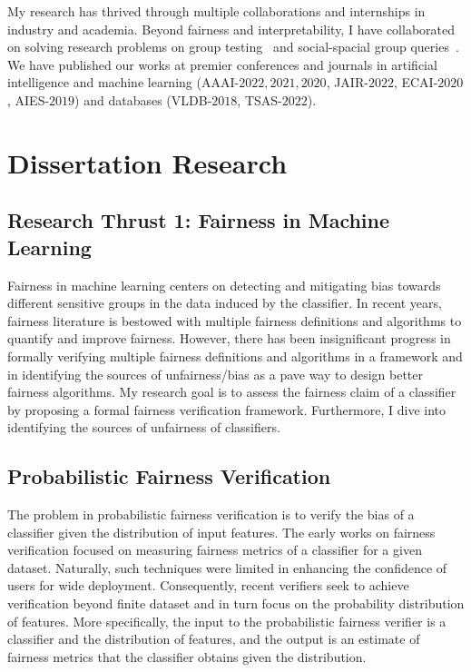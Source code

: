 \documentclass[11pt]{article}
\begin{document}
	
	My research has thrived through multiple collaborations and internships in industry and academia. Beyond fairness and interpretability, I have collaborated on solving research problems on  group testing~\cite{ciampiconi2020maxsat} and social-spacial group queries~\cite{ghosh2018flexible,apon2021social}. We have published our works at premier conferences and journals in artificial intelligence and machine learning (AAAI-$ 2022, 2021, 2020 $, JAIR-$ 2022 $, ECAI-$ 2020 $, AIES-$ 2019 $) and databases (VLDB-$ 2018 $, TSAS-$ 2022 $).
	
	
	
	
	
	\section*{Dissertation Research}
	
	\subsection*{Research Thrust 1: Fairness in Machine Learning}
	
	Fairness in machine learning centers on detecting and mitigating bias towards different sensitive groups in the data induced by the classifier. In recent years, fairness literature is bestowed with multiple fairness definitions and algorithms to quantify and improve fairness. However, there has been insignificant progress in formally verifying multiple fairness definitions and algorithms in a framework and in identifying the sources of unfairness/bias as a pave way to design better fairness algorithms. My research goal is to assess the fairness claim of a classifier by proposing a formal fairness verification framework. Furthermore, I dive into identifying the sources of unfairness of classifiers.
	
	\subsection*{Probabilistic Fairness Verification} The problem in probabilistic fairness verification is to verify the bias of a classifier given the distribution of input features. The early works on fairness verification focused on measuring fairness metrics of a classifier for a given dataset. Naturally, such techniques were limited in enhancing the confidence of users for wide deployment. Consequently, recent verifiers seek to achieve verification beyond  finite dataset and in turn focus on the  probability distribution of features. More specifically, the input to the probabilistic fairness verifier is a classifier and  the distribution of features, and the output is an estimate of fairness metrics that the classifier obtains given the distribution.
	
\end{document}
